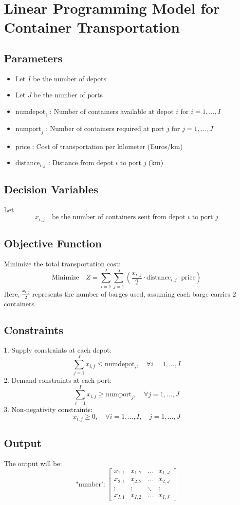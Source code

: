 \documentclass{article}
\begin{document}
\section*{Linear Programming Model for Container Transportation}

\subsection*{Parameters}
\begin{itemize}
    \item Let \( I \) be the number of depots
    \item Let \( J \) be the number of ports
    \item \( \text{numdepot}_i \) : Number of containers available at depot \( i \) for \( i = 1, \ldots, I \)
    \item \( \text{numport}_j \) : Number of containers required at port \( j \) for \( j = 1, \ldots, J \)
    \item \( \text{price} \) : Cost of transportation per kilometer (Euros/km)
    \item \( \text{distance}_{i,j} \) : Distance from depot \( i \) to port \( j \) (km)
\end{itemize}

\subsection*{Decision Variables}
Let 
\[
x_{i,j} \quad \text{be the number of containers sent from depot } i \text{ to port } j
\]

\subsection*{Objective Function}
Minimize the total transportation cost:
\[
\text{Minimize} \quad Z = \sum_{i=1}^{I} \sum_{j=1}^{J} \left( \frac{x_{i,j}}{2} \cdot \text{distance}_{i,j} \cdot \text{price} \right)
\]
Here, \( \frac{x_{i,j}}{2} \) represents the number of barges used, assuming each barge carries 2 containers.

\subsection*{Constraints}
1. Supply constraints at each depot:
\[
\sum_{j=1}^{J} x_{i,j} \leq \text{numdepot}_i, \quad \forall i = 1, \ldots, I
\]
2. Demand constraints at each port:
\[
\sum_{i=1}^{I} x_{i,j} \geq \text{numport}_j, \quad \forall j = 1, \ldots, J
\]
3. Non-negativity constraints:
\[
x_{i,j} \geq 0, \quad \forall i = 1, \ldots, I, \quad j = 1, \ldots, J
\]

\subsection*{Output}
The output will be:
\[
\text{"number"}: \begin{bmatrix}
x_{1,1} & x_{1,2} & \ldots & x_{1,J} \\
x_{2,1} & x_{2,2} & \ldots & x_{2,J} \\
\vdots & \vdots & \ddots & \vdots \\
x_{I,1} & x_{I,2} & \ldots & x_{I,J}
\end{bmatrix}
\]
\end{document}
